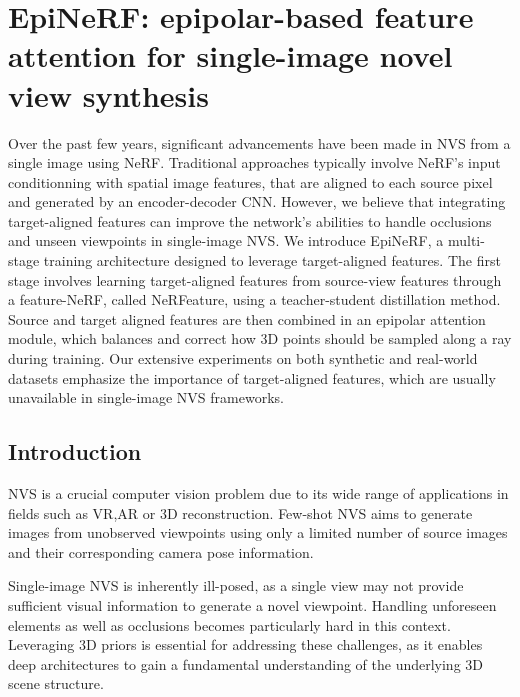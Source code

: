 \chapter{EpiNeRF: epipolar-based feature attention for single-image novel view synthesis}
\label{chapter:epinerf}



Over the past few years, significant advancements have been made in \ac{NVS} from a single image using \ac{NeRF}. Traditional approaches typically involve \ac{NeRF}'s input conditionning with spatial image features, that are aligned to each source pixel and generated by an encoder-decoder \ac{CNN}. However, we believe that integrating target-aligned features can improve the network's abilities to handle occlusions and unseen viewpoints in single-image \ac{NVS}. We introduce EpiNeRF, a multi-stage training architecture designed to leverage target-aligned features. The first stage involves learning target-aligned features from source-view features through a feature-\ac{NeRF}, called NeRFeature, using a teacher-student distillation method. Source and target aligned features are then combined in an epipolar attention module, which balances and correct how 3D points should be sampled along a ray during training. Our extensive experiments on both synthetic and real-world datasets emphasize the importance of target-aligned features, which are usually unavailable in single-image \ac{NVS} frameworks.

\section{Introduction}
\ac{NVS} is a crucial computer vision problem due to its wide range of applications in fields such as \ac{VR},\ac{AR} or 3D reconstruction. Few-shot \ac{NVS} aims to generate images from unobserved viewpoints using only a limited number of source images and their corresponding camera pose information.

Single-image \ac{NVS} is inherently ill-posed, as a single view may not provide sufficient visual information to generate a novel viewpoint. Handling unforeseen elements as well as occlusions becomes particularly hard in this context. Leveraging 3D priors \citep{saito2019pifu,johari2022geonerf} is essential for addressing these challenges, as it enables deep architectures to gain a fundamental understanding of the underlying 3D scene structure.

